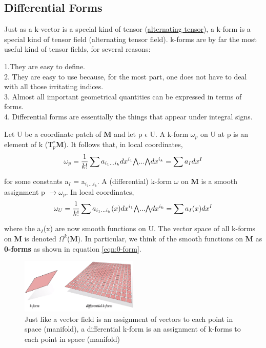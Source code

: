 \subsection{Differential Forms}
Just as a k-vector is a special kind of tensor (\href{https://web2.clarkson.edu/projects/subramanian/ch490/notes/Alternating%20Unit%20Tensor.pdf}{alternating tensor}), a k-form is a
special kind of tensor field (alternating tensor field).  
k-forms are by far the most useful kind of tensor fields, for several reasons:

1.They are easy to define. \\
2. They are easy to use because, for the most part, one does not have to deal with all those irritating indices. \\
3. Almost all important geometrical quantities can be expressed in terms of forms. \\
4. Differential forms are essentially the things that appear under integral signs.

Let U be a coordinate patch of \textbf{M} and let p $\epsilon$ U. A k-form $\omega_p$ on U at p is an element of k (T$_p^*$\textbf{M}). 
It follows that, in local coordinates,
\begin{equation}
    \omega_p = \frac{1}{k!}\sum a_{i_1...i_k}dx^{i_1}\exterior...\exterior dx^{i_k} = \sum a_I dx^I
\end{equation}

for some constants a$_I$ = a$_{i_1...i_k}$. A (differential) k-form $\omega$ on \textbf{M} is a smooth
assignment p $\rightarrow \omega_p$. In local coordinates,
\begin{equation}
    \omega_U = \frac{1}{k!}\sum a_{i_1...i_k}(x)dx^{i_1}\exterior...\exterior dx^{i_k} = \sum a_I(x) dx^I
\end{equation}

where the a$_I$(x) are now smooth functions on U. 
The vector space of all k-forms on \textbf{M} is denoted $\Omega^k$(\textbf{M}). 
In particular, we think of the smooth functions on \textbf{M} as \textbf{0-forms} as shown in equation \ref{eqn:0-form}.

\begin{figure}[ht]
    \begin{center}
        \includegraphics[width=0.5\textwidth]{figures/differential_k-form.png}
        \caption{Just like a vector field is an assignment of vectors to each point in space (manifold), 
        a differential k-form is an assignment of k-forms to each point in space (manifold)}
    \end{center}
\end{figure}

